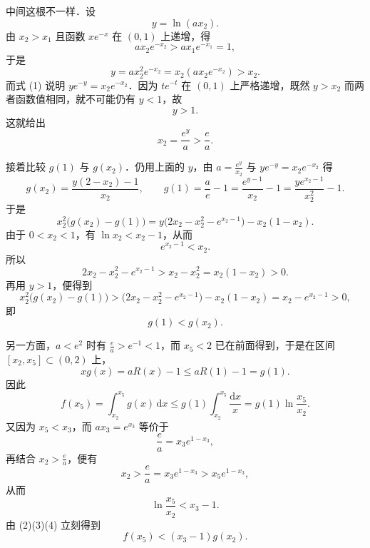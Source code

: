 \begin{solution}
中间这根不一样．设
\[
y=\ln(ax_2).
\]
由 $x_2>x_1$ 且函数 $x e^{-x}$ 在 $(0,1)$ 上递增，得
\[
ax_2e^{-x_2}>ax_1e^{-x_1}=1,
\]
于是
\[
y=ax_2^2e^{-x_2}=x_2(ax_2e^{-x_2})>x_2.
\]
而式 (1) 说明 $y e^{-y}=x_2 e^{-x_2}$．因为 $t e^{-t}$ 在 $(0,1)$ 上严格递增，既然 $y>x_2$ 而两者函数值相同，就不可能仍有 $y<1$，故
\[
y>1.
\]
这就给出
\[
x_2=\frac{e^y}{a}>\frac ea.
\]

接着比较 $g(1)$ 与 $g(x_2)$．仍用上面的 $y$，由 $a=\frac{e^y}{x_2}$ 与 $y e^{-y}=x_2 e^{-x_2}$ 得
\[
g(x_2)=\frac{y(2-x_2)-1}{x_2},\qquad
g(1)=\frac ae-1=\frac{e^{y-1}}{x_2}-1=\frac{y e^{x_2-1}}{x_2^2}-1.
\]
于是
\[
x_2^2\bigl(g(x_2)-g(1)\bigr)
=y\bigl(2x_2-x_2^2-e^{x_2-1}\bigr)-x_2(1-x_2).
\]
由于 $0<x_2<1$，有 $\ln x_2<x_2-1$，从而
\[
e^{x_2-1}<x_2.
\]
所以
\[
2x_2-x_2^2-e^{x_2-1}>x_2-x_2^2=x_2(1-x_2)>0.
\]
再用 $y>1$，便得到
\[
x_2^2\bigl(g(x_2)-g(1)\bigr)
>\bigl(2x_2-x_2^2-e^{x_2-1}\bigr)-x_2(1-x_2)
=x_2-e^{x_2-1}>0,
\]
即
\[
g(1)<g(x_2). \tag{2}
\]

另一方面，$a<e^2$ 时有 $\frac ea>e^{-1}<1$，而 $x_5<2$ 已在前面得到，于是在区间 $[x_2,x_5]\subset(0,2)$ 上，
\[
xg(x)=aR(x)-1\le aR(1)-1=g(1).
\]
因此
\[
f(x_5)=\int_{x_2}^{x_5}g(x)\,\mathrm{d}x
\le g(1)\int_{x_2}^{x_5}\frac{\mathrm{d}x}{x}
=g(1)\ln\frac{x_5}{x_2}. \tag{3}
\]
又因为 $x_5<x_3$，而 $ax_3=e^{x_3}$ 等价于
\[
\frac ea=x_3e^{1-x_3},
\]
再结合 $x_2>\frac ea$，便有
\[
x_2>\frac ea=x_3e^{1-x_3}>x_5e^{1-x_3},
\]
从而
\[
\ln\frac{x_5}{x_2}<x_3-1. \tag{4}
\]
由 (2)(3)(4) 立刻得到
\[
f(x_5)<(x_3-1)g(x_2).
\]
\end{solution}

